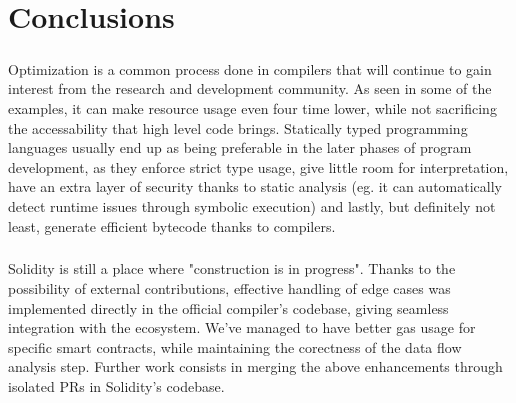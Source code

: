 \chapter{Conclusions} 

\paragraph*{}
Optimization is a common process done in compilers that will continue to gain interest from the research and development community. As seen in some of the examples, it can make resource usage even four time lower, while not sacrificing the accessability that high level code brings. Statically typed programming languages usually end up as being preferable in the later phases of program development, as they enforce strict type usage, give little room for interpretation, have an extra layer of security thanks to static analysis (eg. it can automatically detect runtime issues through symbolic execution) and lastly, but definitely not least, generate efficient bytecode thanks to compilers.

\paragraph*{}
Solidity is still a place where "construction is in progress". Thanks to the possibility of external contributions, effective handling of edge cases was implemented directly in the official compiler's codebase, giving seamless integration with the ecosystem. We've managed to have better gas usage for specific smart contracts, while maintaining the corectness of the data flow analysis step. Further work consists in merging the above enhancements through isolated PRs in Solidity's codebase.
